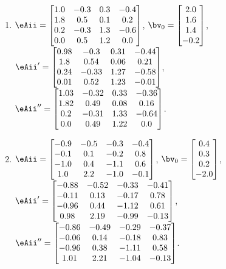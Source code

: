 \begin{exercise}
\begin{enumerate}
\item \(\eAii=\begin{bmatrix} 1.0&-0.3&0.3&-0.4
\\1.8&0.5&0.1&0.2
\\0.2&-0.3&1.3&-0.6
\\0.0&0.5&1.2&0.0 \end{bmatrix}\),
\(\bv_{\arabic{enumii}}=\begin{bmatrix} 2.0
\\1.6
\\1.4
\\-0.2 \end{bmatrix}\), 
\(\eAii'=\begin{bmatrix} 0.98&-0.3&0.31&-0.44
\\1.8&0.54&0.06&0.21
\\0.24&-0.33&1.27&-0.58
\\0.01&0.52&1.23&-0.01 \end{bmatrix}\),
\(\eAii''=\begin{bmatrix} 1.03&-0.32&0.33&-0.36
\\1.82&0.49&0.08&0.16
\\0.2&-0.31&1.33&-0.64
\\0.0&0.49&1.22&0.0 \end{bmatrix}\).

\item \(\eAii=\begin{bmatrix} -0.9&-0.5&-0.3&-0.4
\\-0.1&0.1&-0.2&0.8
\\-1.0&0.4&-1.1&0.6
\\1.0&2.2&-1.0&-0.1 \end{bmatrix}\),
\(\bv_{\arabic{enumii}}=\begin{bmatrix} 0.4
\\0.3
\\0.2
\\-2.0 \end{bmatrix}\), 
\(\eAii'=\begin{bmatrix} -0.88&-0.52&-0.33&-0.41
\\-0.11&0.13&-0.17&0.78
\\-0.96&0.44&-1.12&0.61
\\0.98&2.19&-0.99&-0.13 \end{bmatrix}\),
\(\eAii''=\begin{bmatrix} -0.86&-0.49&-0.29&-0.37
\\-0.06&0.14&-0.18&0.83
\\-0.96&0.38&-1.11&0.58
\\1.01&2.21&-1.04&-0.13 \end{bmatrix}\).

\end{enumerate}
\end{exercise}




